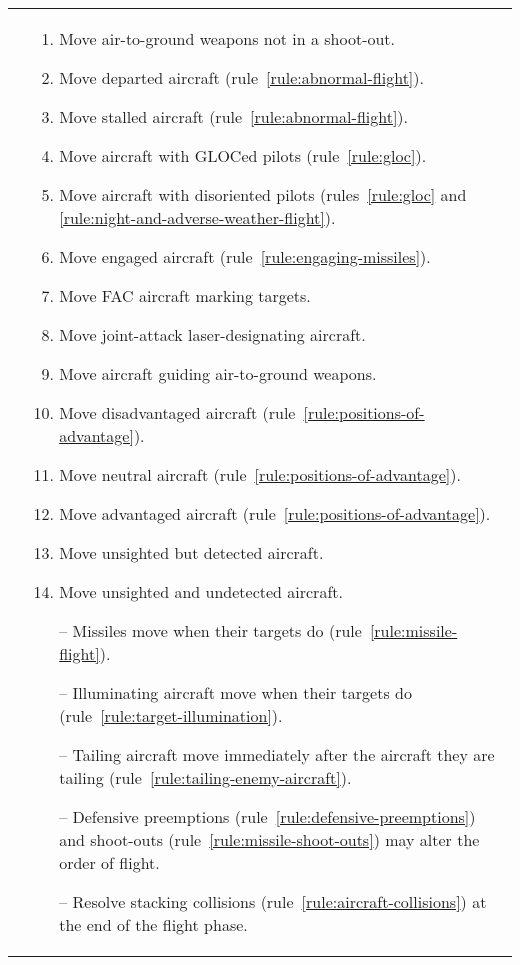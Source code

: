 \begin{twocolumntable}
\begin{tabularx}{1.0\linewidth}{L@{\hspace{\columnsep}}L}
{&

\begin{enumerate}[topsep=0pt,start=7]


\begin{enumerate}[nosep]
    \item Move air-to-ground weapons not in a shoot-out.
    \item Move departed aircraft (rule~\ref{rule:abnormal-flight}).
    \item Move stalled aircraft (rule~\ref{rule:abnormal-flight}).
    \item Move aircraft with GLOCed pilots (rule~\ref{rule:gloc}).
    \item Move aircraft with disoriented pilots (rules~\ref{rule:gloc} and \ref{rule:night-and-adverse-weather-flight}).
    \item Move engaged aircraft (rule~\ref{rule:engaging-missiles}).
    \item Move FAC aircraft marking targets.
    \item Move joint-attack laser-designating aircraft.
    \item Move aircraft guiding air-to-ground weapons.
    \item Move disadvantaged aircraft (rule~\ref{rule:positions-of-advantage}).
    \item Move neutral aircraft (rule~\ref{rule:positions-of-advantage}).
    \item Move advantaged aircraft (rule~\ref{rule:positions-of-advantage}).
    \item Move unsighted but detected aircraft.
    \item Move unsighted and undetected aircraft.
    \item[--] Missiles move when their targets do (rule~\ref{rule:missile-flight}).
    \item[--] Illuminating aircraft move when their targets do (rule~\ref{rule:target-illumination}).
    \item[--] Tailing aircraft move immediately after the aircraft they are tailing (rule~\ref{rule:tailing-enemy-aircraft}).
    \item[--] Defensive preemptions (rule~\ref{rule:defensive-preemptions})  and shoot-outs (rule~\ref{rule:missile-shoot-outs}) may alter the order of flight.
    \item[--] Resolve stacking collisions (rule~\ref{rule:aircraft-collisions}) at the end of the flight phase.
\end{enumerate}


\end{enumerate}}
\end{tabularx}
\end{twocolumntable}
